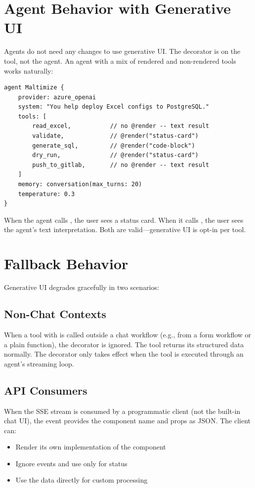 \section{Agent Behavior with Generative UI}

Agents do not need any changes to use generative UI. The  decorator is on the tool, not the agent. An agent with a mix of rendered and non-rendered tools works naturally:

\begin{lstlisting}
agent Maltimize {
    provider: azure_openai
    system: "You help deploy Excel configs to PostgreSQL."
    tools: [
        read_excel,           // no @render -- text result
        validate,             // @render("status-card")
        generate_sql,         // @render("code-block")
        dry_run,              // @render("status-card")
        push_to_gitlab,       // no @render -- text result
    ]
    memory: conversation(max_turns: 20)
    temperature: 0.3
}
\end{lstlisting}

When the agent calls , the user sees a status card. When it calls , the user sees the agent's text interpretation. Both are valid---generative UI is opt-in per tool.

\section{Fallback Behavior}

Generative UI degrades gracefully in two scenarios:

\subsection{Non-Chat Contexts}

When a tool with  is called outside a chat workflow (e.g., from a form workflow or a plain function), the decorator is ignored. The tool returns its structured data normally. The  decorator only takes effect when the tool is executed through an agent's streaming loop.

\subsection{API Consumers}

When the SSE stream is consumed by a programmatic client (not the built-in chat UI), the  event provides the component name and props as JSON. The client can:
\begin{itemize}
    \item Render its own implementation of the component
    \item Ignore  events and use only  for status
    \item Use the  data directly for custom processing
\end{itemize}

